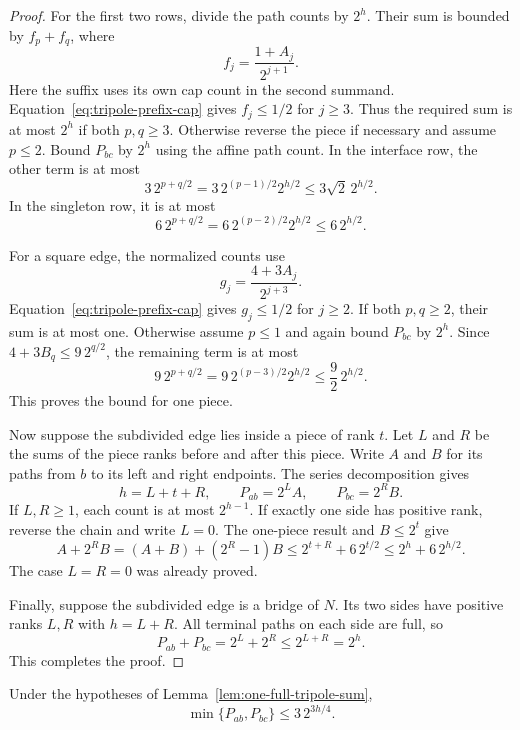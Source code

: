 \begin{proof}
For the first two rows, divide the path counts by $2^h$.
Their sum is bounded by $f_p+f_q$, where
\[
 f_j=\frac{1+A_j}{2^{j+1}}.
\]
Here the suffix uses its own cap count in the second summand.
Equation~\eqref{eq:tripole-prefix-cap} gives $f_j\le1/2$ for $j\ge3$.
Thus the required sum is at most $2^h$ if both $p,q\ge3$.
Otherwise reverse the piece if necessary and assume $p\le2$.
Bound $P_{bc}$ by $2^h$ using the affine path count.
In the interface row, the other term is at most
\[
 3\,2^{p+q/2}=3\,2^{(p-1)/2}2^{h/2}
 \le3\sqrt2\,2^{h/2}.
\]
In the singleton row, it is at most
\[
 6\,2^{p+q/2}=6\,2^{(p-2)/2}2^{h/2}
 \le6\,2^{h/2}.
\]

For a square edge, the normalized counts use
\[
 g_j=\frac{4+3A_j}{2^{j+3}}.
\]
Equation~\eqref{eq:tripole-prefix-cap} gives $g_j\le1/2$ for $j\ge2$.
If both $p,q\ge2$, their sum is at most one.
Otherwise assume $p\le1$ and again bound $P_{bc}$ by $2^h$.
Since $4+3B_q\le9\,2^{q/2}$, the remaining term is at most
\[
 9\,2^{p+q/2}=9\,2^{(p-3)/2}2^{h/2}
 \le\frac92\,2^{h/2}.
\]
This proves the bound for one piece.

Now suppose the subdivided edge lies inside a piece of rank $t$.
Let $L$ and $R$ be the sums of the piece ranks before and after this piece.
Write $A$ and $B$ for its paths from $b$ to its left and right endpoints.
The series decomposition gives
\[
 h=L+t+R,\qquad P_{ab}=2^L A,\qquad P_{bc}=2^R B.
\]
If $L,R\ge1$, each count is at most $2^{h-1}$.
If exactly one side has positive rank, reverse the chain and write $L=0$.
The one-piece result and $B\le2^t$ give
\[
 A+2^R B
 =(A+B)+(2^R-1)B
 \le2^{t+R}+6\,2^{t/2}
 \le2^h+6\,2^{h/2}.
\]
The case $L=R=0$ was already proved.

Finally, suppose the subdivided edge is a bridge of $N$.
Its two sides have positive ranks $L,R$ with $h=L+R$.
All terminal paths on each side are full, so
\[
 P_{ab}+P_{bc}=2^L+2^R\le2^{L+R}=2^h.
\]
This completes the proof.
\end{proof}

\begin{lemma}
\label{lem:one-full-tripole-small-adjacent}
Under the hypotheses of Lemma~\ref{lem:one-full-tripole-sum},
\[
 \min\{P_{ab},P_{bc}\}\le3\,2^{3h/4}.
\]
\end{lemma}

